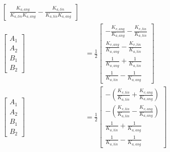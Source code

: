 \begin{align*}
\begin{bmatrix}
    \frac{K_{a,ang}}{K_{a,lin} K_{a,ang}} -
      \frac{K_{a,lin}}{K_{a,lin} K_{a,ang}}
  \end{bmatrix} \\
  \begin{bmatrix}
    A_1 \\
    A_2 \\
    B_1 \\
    B_2
  \end{bmatrix} &= \frac{1}{2}
  \begin{bmatrix}
    -\frac{K_{v,ang}}{K_{a,ang}} -
      \frac{K_{v,lin}}{K_{a,lin}} \\
    \frac{K_{v,ang}}{K_{a,ang}} -
      \frac{K_{v,lin}}{K_{a,lin}} \\
    \frac{1}{K_{a,ang}} + \frac{1}{K_{a,lin}} \\
    \frac{1}{K_{a,lin}} - \frac{1}{K_{a,ang}}
  \end{bmatrix} \\
  \begin{bmatrix}
    A_1 \\
    A_2 \\
    B_1 \\
    B_2
  \end{bmatrix} &= \frac{1}{2}
  \begin{bmatrix}
    -\left(\frac{K_{v,lin}}{K_{a,lin}} +
      \frac{K_{v,ang}}{K_{a,ang}}\right) \\
    -\left(\frac{K_{v,lin}}{K_{a,lin}} -
      \frac{K_{v,ang}}{K_{a,ang}}\right) \\
    \frac{1}{K_{a,lin}} + \frac{1}{K_{a,ang}} \\
    \frac{1}{K_{a,lin}} - \frac{1}{K_{a,ang}}
  \end{bmatrix}
\end{align*}

